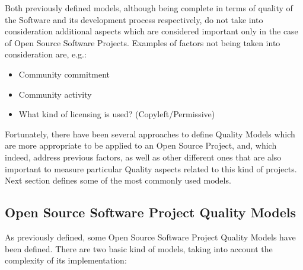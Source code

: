 \documentclass[11pt]{article}
\begin{document}
Both previously defined models, although being complete in terms of quality of the Software and its development process respectively, do not take into consideration additional aspects which are considered important only in the case of Open Source Software Projects. Examples of factors not being taken into consideration are, e.g.:
\begin{itemize}\itemsep0pt
\item{Community commitment}
\item{Community activity}
\item{What kind of licensing is used? (Copyleft/Permissive)}
\end{itemize}
Fortunately, there have been several approaches to define Quality Models which are more appropriate to be applied to an Open Source Project, and, which indeed, address previous factors, as well as other different ones that are also important to measure particular Quality aspects related to this kind of projects. Next section defines some of the most commonly used models.

\subsection{Open Source Software Project Quality Models}\label{sec:oss_quality_models}

As previously defined, some Open Source Software Project Quality Models have been defined. There are two basic kind of models, taking into account the complexity of its implementation:
\end{document}
